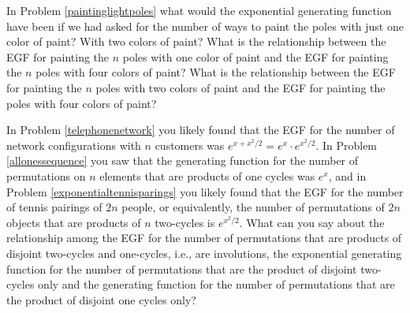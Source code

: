 \bp
\itemm In Problem \ref{paintinglightpoles} what would
the exponential generating function have been if we had asked for the
number of ways to paint the poles with just one color of paint? With two
colors of paint? What is the relationship between the EGF for painting the
$n$ poles with one color of paint and the EGF for painting the
$n$ poles with four colors of paint?  What is the
relationship between the EGF
for painting the $n$ poles with two colors of
paint and the EGF for painting
the poles with four colors of paint?\label{paintinglightpoles2}
\ep

 In Problem \ref{telephonenetwork} you
likely found that the EGF for the number of
network configurations with $n$ customers was $e^{x+x^2/2}= e^x \cdot
e^{x^2/2}$.  In Problem \ref{allonessequence} you saw that the generating
function for the number of  permutations on $n$ elements that are
products of one cycles was
$e^x$, and in Problem \ref{exponentialtennisparings} you likely found that
the EGF for the number of tennis pairings of
$2n$ people, or equivalently, the number of permutations of $2n$ objects
that are products of $n$ two-cycles is $e^{x^2/2}$.  
\bp
\itemes What can you say about the relationship among the EGF for the
number of permutations that are products of disjoint two-cycles and
one-cycles, i.e., are involutions, the exponential generating function for
the number of permutations that are the product of disjoint two-cycles
only and the generating function for the number of permutations that are
the product of disjoint one cycles
only?\label{2cyclesand1cycles}
\ep

